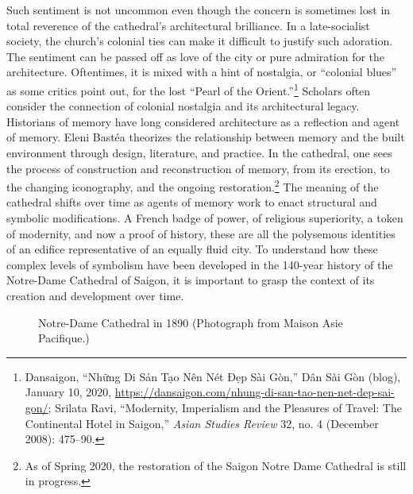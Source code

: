 Such sentiment is not uncommon even though the concern is sometimes lost in total reverence of the cathedral’s architectural brilliance. In a late-socialist society, the church’s colonial ties can make it difficult to justify such adoration. The sentiment can be passed off as love of the city or pure admiration for the architecture. Oftentimes, it is mixed with a hint of nostalgia, or “colonial blues” as some critics point out, for the lost “Pearl of the Orient.”\footnote{Dansaigon, “Những Di Sản Tạo Nên Nét Đẹp Sài Gòn,” Dân Sài Gòn (blog), January 10, 2020, \url{https://dansaigon.com/nhung-di-san-tao-nen-net-dep-sai-gon/}; Srilata Ravi, “Modernity, Imperialism and the Pleasures of Travel: The Continental Hotel in Saigon,” \textit{Asian Studies Review} 32, no. 4 (December 2008): 475–90.} Scholars often consider the connection of colonial nostalgia and its architectural legacy. Historians of memory have long considered architecture as a reflection and agent of memory. Eleni Bastéa theorizes the relationship between memory and the built environment through design, literature, and practice.  In the cathedral, one sees the process of construction and reconstruction of memory, from its erection, to the changing iconography, and the ongoing restoration.\footnote{As of Spring 2020, the restoration of the Saigon Notre Dame Cathedral is still in progress.} The meaning of the cathedral shifts over time as agents of memory work to enact structural and symbolic modifications. A French badge of power, of religious superiority, a token of modernity, and now a proof of history, these are all the polysemous identities of an edifice representative of an equally fluid city. To understand how these complex levels of symbolism have been developed in the 140-year history of the Notre-Dame Cathedral of Saigon, it is important to grasp the context of its creation and development over time. \en

\begin{figure}[!ht]
\begin{center}
\vspace{-.2 in}
\caption[Notre-Dame Cathedral in 1890]{Notre-Dame Cathedral in 1890 (Photograph from Maison Asie Pacifique.\footnotemark) \en}\label{cathedral_past}
\end{center}
\vspace{-.3 in}
\end{figure}

